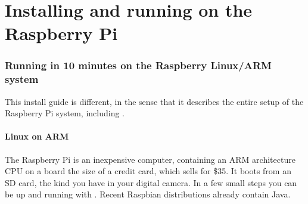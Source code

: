 \chapter{Installing and running on the Raspberry Pi}
\subsection{Running \nr{} in 10 minutes on the Raspberry Linux/ARM system}
This install guide is different, in the sense that it describes the entire setup of the Raspberry Pi system, including \nr{}.

\subsubsection{Linux on ARM}
The Raspberry Pi is an inexpensive computer, containing an ARM architecture CPU on a board the size of a credit card, which sells for \$35. It boots from an SD card, the kind you have in your digital camera. In a few small steps you can be up and running with \nr{}. Recent Raspbian distributions already contain Java. 
